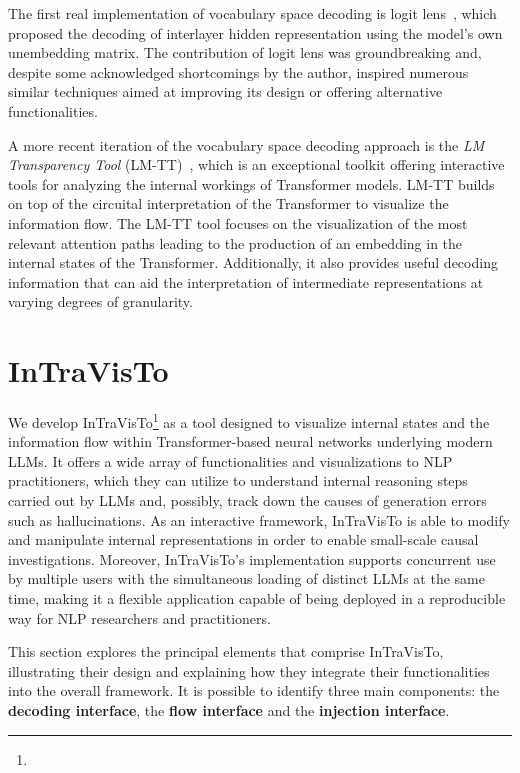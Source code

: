 \documentclass[11pt,a4paper,twocolumn]{article}
\begin{document}
The first real implementation of vocabulary space decoding is logit lens~\cite{nostalgebraist2020}, which proposed the decoding of interlayer hidden representation using the model's own unembedding matrix.
The contribution of logit lens was groundbreaking and, despite some acknowledged shortcomings by the author, inspired numerous similar techniques aimed at improving its design or offering alternative functionalities.

A more recent iteration of the vocabulary space decoding approach is the \emph{LM Transparency Tool} (LM-TT)~\cite{tufanov2024}, which is an exceptional toolkit offering interactive tools for analyzing the internal workings of Transformer models.
LM-TT builds on top of the circuital interpretation of the Transformer to visualize the information flow.
The LM-TT tool focuses on the visualization of the most relevant attention paths leading to the production of an embedding in the internal states of the Transformer.
Additionally, it also provides useful decoding information that can aid the interpretation of intermediate representations at varying degrees of granularity.

\section{InTraVisTo}\label{sec:intravisto}

We develop InTraVisTo\footnote{} as a tool designed to visualize internal states and the information flow within Transformer-based neural networks underlying modern LLMs.
It offers a wide array of functionalities and visualizations to NLP practitioners, which they can utilize to understand internal reasoning steps carried out by LLMs and, possibly, track down the causes of generation errors such as hallucinations.
As an interactive framework, InTraVisTo is able to modify and manipulate internal representations in order to enable small-scale causal investigations.
Moreover, InTraVisTo's implementation supports concurrent use by multiple users with the simultaneous loading of distinct LLMs at the same time, making it a flexible application capable of being deployed in a reproducible way for NLP researchers and practitioners.

This section explores the principal elements that comprise InTraVisTo, illustrating their design and explaining how they integrate their functionalities into the overall framework.
It is possible to identify three main components: the \textbf{decoding interface}, the \textbf{flow interface} and the \textbf{injection interface}.
\end{document}

